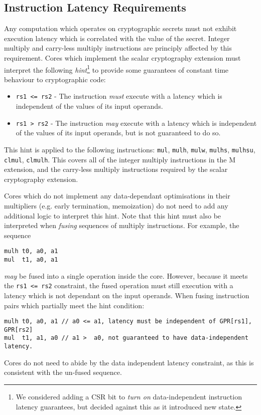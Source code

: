
\subsection{Instruction Latency Requirements}
\label{sec:scalar:timing}

Any computation which operates on cryptographic secrets must not
exhibit execution latency which is correlated with the value of the
secret.
Integer multiply and carry-less multiply instructions are principly affected
by this requirement.
Cores which implement the scalar cryptography
extension must interpret the following {\em hint}\footnote{
We considered adding a CSR bit to {\em turn on} data-independent instruction
latency guarantees, but decided against this as it introduced new state.
} to provide some
guarantees of constant time behaviour to cryptographic code:

\begin{itemize}
\item {\tt rs1 <= rs2} - 
    The instruction {\em must} execute with a latency which is
    independent of the values of its input operands.
\item {\tt rs1  > rs2} - 
    The instruction {\em may} execute with a latency which is
    independent of the values of its input operands, but is not
    guaranteed to do so.
\end{itemize}

This hint is applied to the following instructions:
{\tt mul},
{\tt mulh},
{\tt mulw},
{\tt mulhs},
{\tt mulhsu},
{\tt clmul},
{\tt clmulh}.
This covers all of the integer multiply instructions in the
M extension, and the carry-less multiply instructions required by the
scalar cryptography extension.

Cores which do not implement any data-dependant optimisations in their
multipliers (e.g. early termination, memoization) do not need to add
any additional logic to interpret this hint.
Note that this hint must also be interpreted when {\em fusing}
sequences of multiply instructions. For example, the sequence
\begin{verbatim}
mulh t0, a0, a1
mul  t1, a0, a1
\end{verbatim}
{\em may} be fused into a single operation inside the core.
However, because it meets the {\tt rs1 <= rs2} constraint, the fused
operation must still execution with a latency which is not dependant on
the input operands.
When fusing instruction pairs which partially meet the hint condition:
\begin{verbatim}
mulh t0, a0, a1 // a0 <= a1, latency must be independent of GPR[rs1], GPR[rs2]
mul  t1, a1, a0 // a1 >  a0, not guaranteed to have data-independent latency.
\end{verbatim}
Cores do not need to abide by the data independent latency constraint,
as this is consistent with the un-fused sequence.

